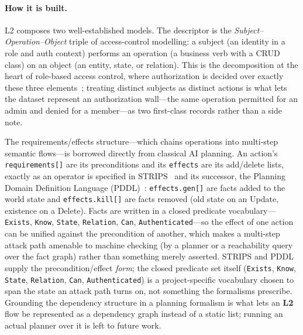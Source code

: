\documentclass[11pt,a4paper]{article}
\newcommand{\cd}[1]{\lstinline[basicstyle=\ttfamily\small]|#1|}
\renewcommand{\L}[1]{\textbf{L#1}}
\begin{document}
\paragraph{How it is built.} L2 composes two well-established models. The descriptor is
the \emph{Subject--Operation--Object} triple of access-control modelling: a subject (an
identity in a role and auth context) performs an operation (a business verb with a CRUD
class) on an object (an entity, state, or relation). This is the decomposition at the
heart of role-based access control, where authorization is decided over exactly these
three elements~\citep{rbac}; treating distinct subjects as distinct actions is what lets
the dataset represent an authorization wall---the same operation permitted for an admin
and denied for a member---as two first-class records rather than a side note.

The requirements/effects structure---which chains operations into multi-step semantic
flows---is borrowed directly from classical AI planning. An action's \cd{requirements[]}
are its preconditions and its \cd{effects} are its add/delete lists, exactly as an
operator is specified in STRIPS~\citep{strips} and its successor, the Planning Domain
Definition Language (PDDL)~\citep{pddl}: \cd{effects.gen[]} are facts added to the world
state and \cd{effects.kill[]} are facts removed (old state on an Update, existence on a
Delete). Facts are written in a closed predicate vocabulary---\cd{Exists}, \cd{Know},
\cd{State}, \cd{Relation}, \cd{Can}, \cd{Authenticated}---so the effect of one action can
be unified against the precondition of another, which makes a multi-step attack path
amenable to machine checking (by a planner or a reachability query over the fact graph)
rather than something merely asserted. STRIPS and PDDL supply the precondition/effect
\emph{form}; the closed predicate set itself (\cd{Exists}, \cd{Know}, \cd{State},
\cd{Relation}, \cd{Can}, \cd{Authenticated}) is a project-specific vocabulary chosen to span
the state an attack path turns on, not something the formalisms prescribe. Grounding the
dependency structure in a planning
formalism is what lets an \L2 flow be represented as a dependency graph instead of a static
list; running an actual planner over it is left to future work.
\end{document}
